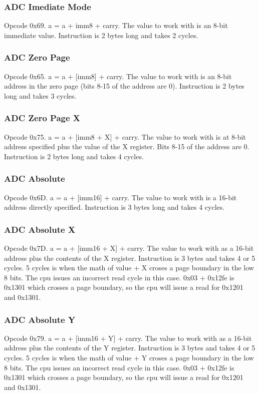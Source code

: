 \documentclass[letterpaper,12pt,twoside]{book}
\begin{document}
\subsubsection {ADC Imediate Mode}
Opcode 0x69. a = a + imm8 + carry. The value to work with is an 8-bit immediate value. Instruction is 2 bytes long and takes 2 cycles.
\subsubsection{ADC Zero Page}
Opcode 0x65. a = a + [imm8] + carry. The value to work with is an 8-bit address in the zero page (bits 8-15 of the address are 0). Instruction is 2 bytes long and takes 3 cycles.
\subsubsection{ADC Zero Page X}
Opcode 0x75. a = a + [imm8 + X] + carry. The value to work with is at 8-bit address specified plus the value of the X register. Bits 8-15 of the address are 0. Instruction is 2 bytes long and takes 4 cycles.
\subsubsection {ADC Absolute}
Opcode 0x6D. a = a + [imm16] + carry. The value to work with is a 16-bit address directly specified. Instruction is 3 bytes long and takes 4 cycles.
\subsubsection {ADC Absolute X}
Opcode 0x7D. a = a + [imm16 + X] + carry. The value to work with as a 16-bit address plus the contents of the X register. Instruction is 3 bytes and takes 4 or 5 cycles. 5 cycles is when the math of value + X croses a page boundary in the low 8 bits. The cpu issues an incorrect read cycle in this case. 0x03 + 0x12fe is 0x1301 which crosses a page boundary, so the cpu will issue a read for 0x1201 and 0x1301.
\subsubsection {ADC Absolute Y}
Opcode 0x79. a = a + [imm16 + Y] + carry. The value to work with as a 16-bit address plus the contents of the Y register. Instruction is 3 bytes and takes 4 or 5 cycles. 5 cycles is when the math of value + Y croses a page boundary in the low 8 bits. The cpu issues an incorrect read cycle in this case. 0x03 + 0x12fe is 0x1301 which crosses a page boundary, so the cpu will issue a read for 0x1201 and 0x1301.
\end{document}
